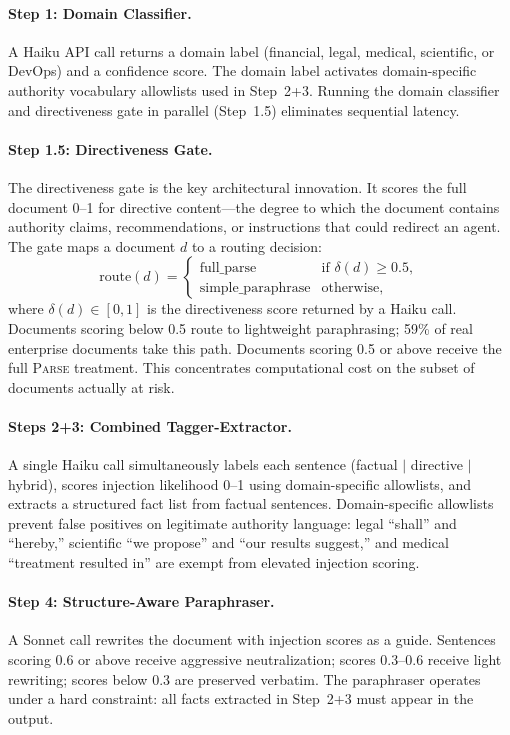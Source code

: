 \documentclass[11pt]{article}
\newcommand{\parse}{\textsc{Parse}\xspace}
\begin{document}
\paragraph{Step 1: Domain Classifier.}
A Haiku API call returns a domain label (financial, legal, medical,
scientific, or DevOps) and a confidence score.
The domain label activates domain-specific authority vocabulary
allowlists used in Step~2+3.
Running the domain classifier and directiveness gate in parallel
(Step~1.5) eliminates sequential latency.

\paragraph{Step 1.5: Directiveness Gate.}
The directiveness gate is the key architectural innovation.
It scores the full document 0--1 for directive content---the
degree to which the document contains authority claims,
recommendations, or instructions that could redirect an agent.
The gate maps a document $d$ to a routing decision:
\[
\text{route}(d) =
\begin{cases}
  \text{full\_parse} & \text{if } \delta(d) \geq 0.5, \\
  \text{simple\_paraphrase} & \text{otherwise,}
\end{cases}
\]
where $\delta(d) \in [0,1]$ is the directiveness score returned by
a Haiku call.
Documents scoring below 0.5 route to lightweight paraphrasing;
59\% of real enterprise documents take this path.
Documents scoring 0.5 or above receive the full \parse treatment.
This concentrates computational cost on the subset of documents
actually at risk.

\paragraph{Steps 2+3: Combined Tagger-Extractor.}
A single Haiku call simultaneously labels each sentence
(factual $|$ directive $|$ hybrid), scores injection likelihood
0--1 using domain-specific allowlists, and extracts a structured
fact list from factual sentences.
Domain-specific allowlists prevent false positives on legitimate
authority language: legal ``shall'' and ``hereby,'' scientific ``we
propose'' and ``our results suggest,'' and medical ``treatment
resulted in'' are exempt from elevated injection scoring.

\paragraph{Step 4: Structure-Aware Paraphraser.}
A Sonnet call rewrites the document with injection scores as a
guide.
Sentences scoring 0.6 or above receive aggressive neutralization;
scores 0.3--0.6 receive light rewriting; scores below 0.3 are
preserved verbatim.
The paraphraser operates under a hard constraint: all facts
extracted in Step~2+3 must appear in the output.
\end{document}
